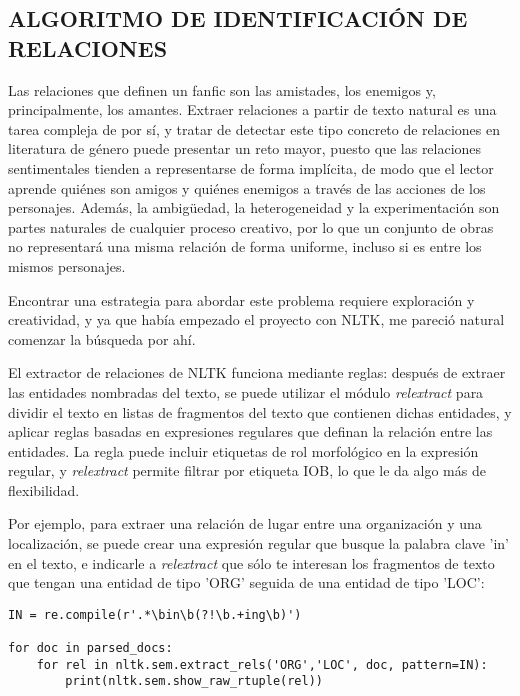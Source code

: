 \documentclass{pre-tfg}
\begin{document}


\subsection{ALGORITMO DE IDENTIFICACIÓN DE RELACIONES}

Las relaciones que definen un fanfic son las amistades, los enemigos y, principalmente, los amantes. Extraer relaciones a partir de texto natural es una tarea compleja de por sí, y tratar de detectar este tipo concreto de relaciones en literatura de género puede presentar un reto mayor, puesto que las relaciones sentimentales tienden a representarse de forma implícita, de modo que el lector aprende quiénes son amigos y quiénes enemigos a través de las acciones de los personajes. Además, la ambigüedad, la heterogeneidad y la experimentación son partes naturales de cualquier proceso creativo, por lo que un conjunto de obras no representará una misma relación de forma uniforme, incluso si es entre los mismos personajes.

Encontrar una estrategia para abordar este problema requiere exploración y creatividad, y ya que había empezado el proyecto con NLTK, me pareció natural comenzar la búsqueda por ahí.

El extractor de relaciones de NLTK funciona mediante reglas: después de extraer las entidades nombradas del texto, se puede utilizar el módulo \textit{relextract} para dividir el texto en listas de fragmentos del texto que contienen dichas entidades, y aplicar reglas basadas en expresiones regulares que definan la relación entre las entidades. La regla puede incluir etiquetas de rol morfológico en la expresión regular, y \textit{relextract} permite filtrar por etiqueta IOB, lo que le da algo más de flexibilidad.

Por ejemplo, para extraer una relación de lugar entre una organización y una localización, se puede crear una expresión regular que busque la palabra clave 'in' en el texto, e indicarle a \textit{relextract} que sólo te interesan los fragmentos de texto que tengan una entidad de tipo 'ORG' seguida de una entidad de tipo 'LOC':
\begin{lstlisting}[style=consola, caption=Ejemplo de código que utiliza el módulo \textit{regexp} de NLTK para extraer relaciones de lugar y mostrarlas por pantalla. Adaptado del capítulo 7 de Natural Language Processing with Python\cite{bird_2012}]
IN = re.compile(r'.*\bin\b(?!\b.+ing\b)')

for doc in parsed_docs:
	for rel in nltk.sem.extract_rels('ORG','LOC', doc, pattern=IN):
		print(nltk.sem.show_raw_rtuple(rel))

\end{lstlisting}
\end{document}
